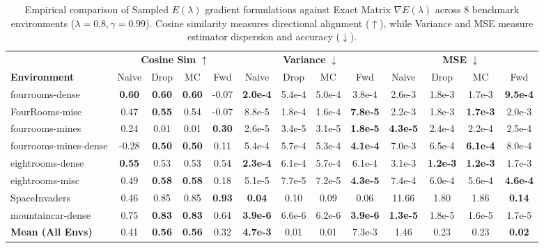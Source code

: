 \documentclass{article}
\theoremstyle{plain}
\theoremstyle{definition}
\theoremstyle{remark}
\begin{document}
\newpage
\begin{table}[t]
\centering
\setlength{\tabcolsep}{4.3pt}
\caption{Empirical comparison of Sampled $E(\lambda)$ gradient formulations against Exact Matrix $\nabla E(\lambda)$ across 8 benchmark environments ($\lambda=0.8, \gamma=0.99$). Cosine similarity measures directional alignment ($\uparrow$), while Variance and MSE measure estimator dispersion and accuracy ($\downarrow$).}
\label{tab:sampled_E_lambda_per_env}
\vspace{4pt}
\begin{tabular}{l cccc cccc cccc}
\toprule
& \multicolumn{4}{c}{\textbf{Cosine Sim} $\uparrow$} & \multicolumn{4}{c}{\textbf{Variance} $\downarrow$} & \multicolumn{4}{c}{\textbf{MSE} $\downarrow$} \\
\cmidrule(lr){2-5} \cmidrule(lr){6-9} \cmidrule(lr){10-13}
\textbf{Environment} & Naive & Drop & MC & Fwd & Naive & Drop & MC & Fwd & Naive & Drop & MC & Fwd \\
\midrule
fourrooms-dense       & \textbf{0.60} & \textbf{0.60} & \textbf{0.60} & -0.07 & \textbf{2.0e-4} & 5.4e-4 & 5.0e-4 & 3.8e-4 & 2.6e-3 & 1.8e-3 & 1.7e-3 & \textbf{9.5e-4} \\
FourRooms-misc        & 0.47 & \textbf{0.55} & 0.54 & -0.07 & 8.8e-5 & 1.8e-4 & 1.6e-4 & \textbf{7.8e-5} & 2.2e-3 & 1.8e-3 & \textbf{1.7e-3} & 2.0e-3 \\
fourrooms-mines       & 0.24 & 0.01 & 0.01 & \textbf{0.30} & 2.6e-5 & 3.4e-5 & 3.1e-5 & \textbf{1.8e-5} & \textbf{4.3e-5} & 2.4e-4 & 2.2e-4 & 2.5e-4 \\
fourrooms-mines-dense & -0.28 & \textbf{0.50} & \textbf{0.50} & 0.11 & 5.4e-4 & 5.7e-4 & 5.3e-4 & \textbf{4.1e-4} & 7.0e-3 & 6.5e-4 & \textbf{6.1e-4} & 8.0e-4 \\
eightrooms-dense      & \textbf{0.55} & 0.53 & 0.53 & 0.54 & \textbf{2.3e-4} & 6.1e-4 & 5.7e-4 & 6.1e-4 & 3.1e-3 & \textbf{1.2e-3} & \textbf{1.2e-3} & 1.7e-3 \\
eightrooms-misc       & 0.49 & \textbf{0.58} & \textbf{0.58} & 0.18 & 5.1e-5 & 7.7e-5 & 7.2e-5 & \textbf{4.3e-5} & 7.4e-4 & 6.0e-4 & 5.6e-4 & \textbf{4.6e-4} \\
SpaceInvaders         & 0.46 & 0.85 & 0.85 & \textbf{0.93} & \textbf{0.04} & 0.10 & 0.09 & 0.06 & 11.66 & 1.80 & 1.86 & \textbf{0.14} \\
mountaincar-dense     & 0.75 & \textbf{0.83} & \textbf{0.83} & 0.64 & \textbf{3.9e-6} & 6.6e-6 & 6.2e-6 & \textbf{3.9e-6} & \textbf{1.3e-5} & 1.8e-5 & 1.6e-5 & 1.7e-5 \\
\midrule
\textbf{Mean (All Envs)} & 0.41 & \textbf{0.56} & \textbf{0.56} & 0.32 & \textbf{4.7e-3} & 0.01 & 0.01 & 7.3e-3 & 1.46 & 0.23 & 0.23 & \textbf{0.02} \\
\bottomrule
\end{tabular}
\end{table}
\end{document}
